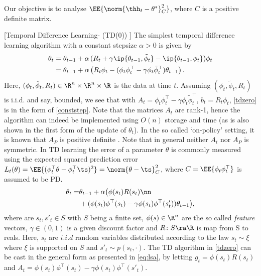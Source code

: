 Our objective is to analyse $\EE{\norm{\thh_t-\theta^*}_C^2}$, where $C$ is a positive definite matrix.

\begin{example}\label{ex:tdzero}[Temporal Difference Learning-  (TD(0)) ]
The simplest temporal difference learning algorithm with a constant stepsize $\alpha>0$ is given by
\begin{align}
\label{tdzero}
\begin{split}
\theta_t
& = \theta_{t-1}+\alpha\, (R_t+ \gamma \ip{\theta_{t-1},\tilde{\phi}_t } - \ip{\theta_{t-1},\phi_t})\phi_t \\
& = \theta_{t-1}+\alpha\, \bigl( R_t\phi_t- (\phi_t \phi_t^\top-\gamma \phi_t \tilde{\phi}_t^\top)\theta_{t-1}\bigr)\,.
\end{split}
\end{align}
Here, $(\phi_t,\tilde{\phi}_t,R_t)\in \R^n\times \R^n \times \R$ is the data at time $t$.
Assuming $(\phi_t,\tilde{\phi}_t,R_t)$ is i.i.d. and say, bounded,
we see that with $A_t = \phi_t \phi_t^\top-\gamma \phi_t \tilde{\phi}_t^\top$, $b_t = R_t \phi_t$, \eqref{tdzero} is in the form of
\eqref{conststep}.
Note that the matrices $A_t$ are rank-1, hence the algorithm can indeed be implemented using $O(n)$ storage and
time (as is also shown in the first form of the update of $\theta_t$). In the so called `on-policy' setting, it is known that $A_P$ is positive definite \cite{}. Note that in general neither $A_t$ nor $A_P$ is symmetric.
In TD learning the error of a parameter $\theta$ is commonly measured using the expected squared
prediction error $L_t(\theta) = \EE{ (\phi_t^\top \theta - \phi_t^\top \ts)^2 } = \norm{\theta - \ts}_C^2$,
where $C = \EE{ \phi_t \phi_t^\top }$ is assumed to be PD.
\begin{align}\label{tdzero}
\theta_t=&\theta_{t-1}+\alpha \big(\phi(s_t) R(s_t)\nn\\&+ (\phi(s_t)\phi^\top(s_t)-\gamma \phi(s_t)\phi^\top(s'_t))\theta_{t-1}\big),
\end{align}
where are $s_t,s'_t\in S$ with $S$ being a finite set, $\phi(s)\in \R^n$ are the so called \emph{feature} vectors, $\gamma\in (0,1)$ is a given discount factor and $R\colon S\ra \R$ is map from S to reals. 
Here, $s_t$ are $i.i.d$ random variables distributed according to the law $s_t\sim \xi$ where $\xi$ is supported on $S$ and $s'_t\sim p(s_t,\cdot)$. The TD algorithm in \eqref{tdzero} can be cast in the general form as presented in \eqref{eq:lsa}, by letting $g_t=\phi(s_t)R(s_t)$ and $A_t=\phi(s_t)\phi^\top(s_t)-\gamma \phi(s_t)\phi^\top(s'_t)$.
\fi
\end{example}

